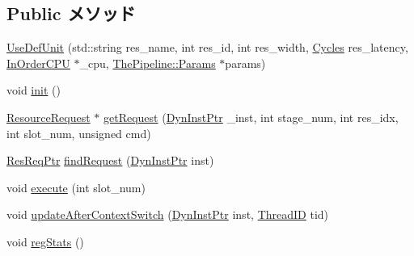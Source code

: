 \subsection*{Public メソッド}
\begin{DoxyCompactItemize}
\item 
\hyperlink{classUseDefUnit_a75c5c187ebe767d923c1cb13ba91df2f}{UseDefUnit} (std::string res\_\-name, int res\_\-id, int res\_\-width, \hyperlink{classCycles}{Cycles} res\_\-latency, \hyperlink{classInOrderCPU}{InOrderCPU} $\ast$\_\-cpu, \hyperlink{namespaceThePipeline_ab62ca16eeca26566ad2422b5df4943ce}{ThePipeline::Params} $\ast$params)
\item 
void \hyperlink{classUseDefUnit_a02fd73d861ef2e4aabb38c0c9ff82947}{init} ()
\item 
\hyperlink{classResourceRequest}{ResourceRequest} $\ast$ \hyperlink{classUseDefUnit_aae5ce84f94a1057d7f60172daf5d731d}{getRequest} (\hyperlink{classRefCountingPtr}{DynInstPtr} \_\-inst, int stage\_\-num, int res\_\-idx, int slot\_\-num, unsigned cmd)
\item 
\hyperlink{classResourceRequest}{ResReqPtr} \hyperlink{classUseDefUnit_ae3afc1c63d17a49a6301bd18fca574a0}{findRequest} (\hyperlink{classRefCountingPtr}{DynInstPtr} inst)
\item 
void \hyperlink{classUseDefUnit_a7b7fff82f8c9cbdb02add1346f60bb9e}{execute} (int slot\_\-num)
\item 
void \hyperlink{classUseDefUnit_a339073618ad3c21c492d64a55ce2e216}{updateAfterContextSwitch} (\hyperlink{classRefCountingPtr}{DynInstPtr} inst, \hyperlink{base_2types_8hh_ab39b1a4f9dad884694c7a74ed69e6a6b}{ThreadID} tid)
\item 
void \hyperlink{classUseDefUnit_a4dc637449366fcdfc4e764cdf12d9b11}{regStats} ()
\end{DoxyCompactItemize}
